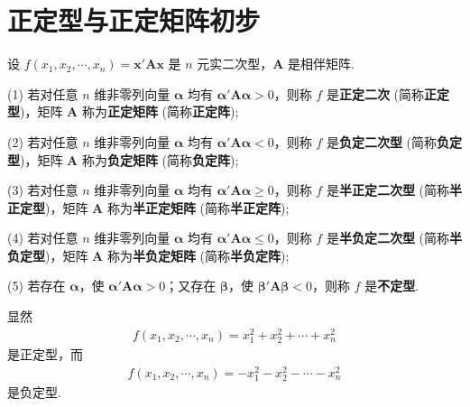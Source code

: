 \documentclass[../../main.tex]{subfiles}%
\begin{document}
\section{正定型与正定矩阵初步}

\begin{definition}
设 $f(x_1,x_2,\cdots,x_n)=\boldsymbol{x}'\boldsymbol{A}\boldsymbol{x}$ 是 $n$ 元实二次型，$\boldsymbol{A}$ 是相伴矩阵.

(1) 若对任意 $n$ 维非零列向量 $\boldsymbol{\alpha}$ 均有 $\boldsymbol{\alpha}'\boldsymbol{A}\boldsymbol{\alpha}>0$，则称 $f$ 是\textbf{正定二次} (简称\textbf{正定型})，矩阵 $\boldsymbol{A}$ 称为\textbf{正定矩阵} (简称\textbf{正定阵});

(2) 若对任意 $n$ 维非零列向量 $\boldsymbol{\alpha}$ 均有 $\boldsymbol{\alpha}'\boldsymbol{A}\boldsymbol{\alpha}<0$，则称 $f$ 是\textbf{负定二次型} (简称\textbf{负定型})，矩阵 $\boldsymbol{A}$ 称为\textbf{负定矩阵} (简称\textbf{负定阵});

(3) 若对任意 $n$ 维非零列向量 $\boldsymbol{\alpha}$ 均有 $\boldsymbol{\alpha}'\boldsymbol{A}\boldsymbol{\alpha}\geqslant 0$，则称 $f$ 是\textbf{半正定二次型} (简称\textbf{半正定型})，矩阵 $\boldsymbol{A}$ 称为\textbf{半正定矩阵} (简称\textbf{半正定阵});

(4) 若对任意 $n$ 维非零列向量 $\boldsymbol{\alpha}$ 均有 $\boldsymbol{\alpha}'\boldsymbol{A}\boldsymbol{\alpha}\leqslant 0$，则称 $f$ 是\textbf{半负定二次型} (简称\textbf{半负定型})，矩阵 $\boldsymbol{A}$ 称为\textbf{半负定矩阵} (简称\textbf{半负定阵});

(5) 若存在 $\boldsymbol{\alpha}$，使 $\boldsymbol{\alpha}'\boldsymbol{A}\boldsymbol{\alpha}>0$；又存在 $\boldsymbol{\beta}$，使 $\boldsymbol{\beta}'\boldsymbol{A}\boldsymbol{\beta}<0$，则称 $f$ 是\textbf{不定型}.
\end{definition}
\begin{remark}
显然
\begin{align*}
f(x_1,x_2,\cdots,x_n)=x_1^2 + x_2^2 + \cdots + x_n^2
\end{align*}
是正定型，而
\begin{align*}
f(x_1,x_2,\cdots,x_n)=-x_1^2 - x_2^2 - \cdots - x_n^2
\end{align*}
是负定型. 
\end{remark}
\end{document}
